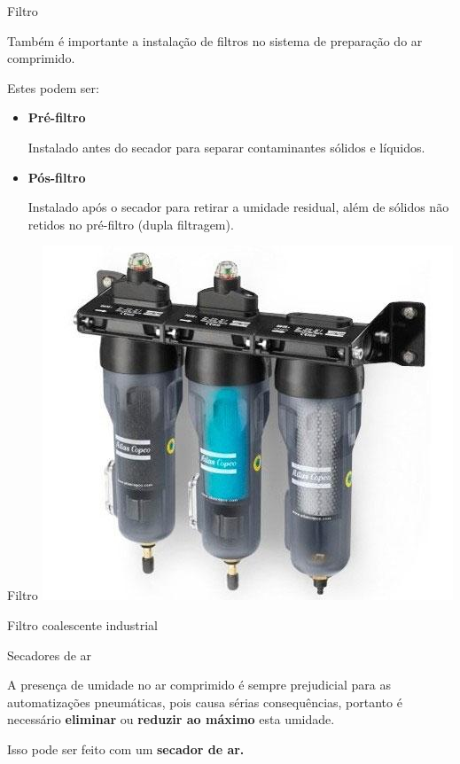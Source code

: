 \begin{frame}{Filtro}
	\begin{block}{}
		Também é importante a instalação de filtros no sistema de preparação do ar comprimido.
		
		Estes podem ser:
		\begin{itemize}
			\item \textbf{Pré-filtro}
			
			Instalado antes do secador para separar contaminantes sólidos e líquidos.
			\item \textbf{Pós-filtro}
			
			Instalado após o secador para retirar a umidade residual, além de sólidos não retidos no pré-filtro (dupla filtragem).
		\end{itemize}
	\end{block}
\end{frame}


\begin{frame}{Filtro}
	\centering
	\includegraphics[height=0.8\textheight]{Figuras/Ch13/fig3}
	
	Filtro coalescente industrial
\end{frame}


\begin{frame}{Secadores de ar}
	\begin{block}{}
		A presença de umidade no ar comprimido é sempre prejudicial
		para as automatizações pneumáticas, pois causa sérias
		consequências, portanto é necessário \textbf{eliminar} ou \textbf{reduzir ao máximo} esta umidade.
		
		Isso pode ser feito com um \textbf{secador de ar.}
	\end{block}
\end{frame}


